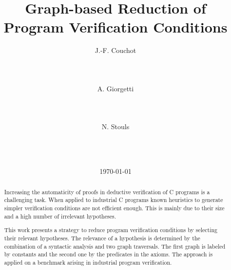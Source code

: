 \documentclass{acm_proc_article-sp}
\theoremstyle{nonumberplain}
\begin{document}
\title{Graph-based Reduction of Program Verification Conditions}




\author{
\alignauthor
J.-F. Couchot\\
\\
\\
\\
\alignauthor
A. Giorgetti\\
\\
\\
\\
\alignauthor
N. Stouls\\
       \\
       \\
       \\
}
\additionalauthors{}
\date{\today}

\maketitle
\begin{abstract}
Increasing the automaticity of proofs in deductive verification of C
programs is a challenging task. When applied to industrial C programs
known heuristics to generate simpler verification conditions are not
efficient enough. This is mainly due to their size and a high number of
irrelevant hypotheses.



This work presents a strategy to reduce program verification conditions
by selecting their relevant hypotheses. The relevance of a hypothesis
is determined by the combination of a syntactic analysis and two graph
traversals. The first graph is labeled by constants and
the second one by the predicates in the axioms. The approach is
applied on a benchmark arising in industrial program verification.
\end{abstract}



\end{document}

